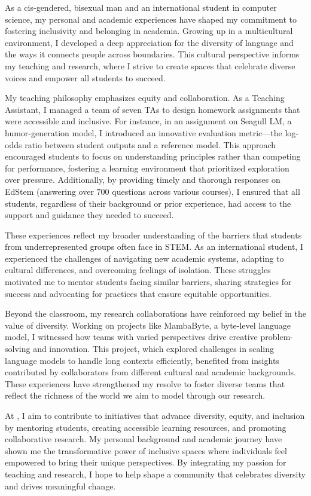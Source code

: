 As a cis-gendered, bisexual man and an international student in computer science, my personal and academic experiences have shaped my commitment to fostering inclusivity and belonging in academia.
% 
Growing up in a multicultural environment, I developed a deep appreciation for the diversity of language and the ways it connects people across boundaries.
% 
This cultural perspective informs my teaching and research, where I strive to create spaces that celebrate diverse voices and empower all students to succeed.

My teaching philosophy emphasizes equity and collaboration.
% 
As a Teaching Assistant, I managed a team of seven TAs to design homework assignments that were accessible and inclusive.
% 
For instance, in an assignment on Seagull LM, a humor-generation model, I introduced an innovative evaluation metric---the log-odds ratio between student outputs and a reference model.
% 
This approach encouraged students to focus on understanding principles rather than competing for performance, fostering a learning environment that prioritized exploration over pressure.
% 
Additionally, by providing timely and thorough responses on EdStem (answering over $700$ questions across various courses), I ensured that all students, regardless of their background or prior experience, had access to the support and guidance they needed to succeed.

These experiences reflect my broader understanding of the barriers that students from underrepresented groups often face in STEM.
% 
As an international student, I experienced the challenges of navigating new academic systems, adapting to cultural differences, and overcoming feelings of isolation.
% 
These struggles motivated me to mentor students facing similar barriers, sharing strategies for success and advocating for practices that ensure equitable opportunities.

Beyond the classroom, my research collaborations have reinforced my belief in the value of diversity.
% 
Working on projects like MambaByte, a byte-level language model, I witnessed how teams with varied perspectives drive creative problem-solving and innovation.
% 
This project, which explored challenges in scaling language models to handle long contexts efficiently, benefited from insights contributed by collaborators from different cultural and academic backgrounds.
% 
These experiences have strengthened my resolve to foster diverse teams that reflect the richness of the world we aim to model through our research.

At \thecollegeabbr, I aim to contribute to initiatives that advance diversity, equity, and inclusion by mentoring students, creating accessible learning resources, and promoting collaborative research.
% 
My personal background and academic journey have shown me the transformative power of inclusive spaces where individuals feel empowered to bring their unique perspectives.
% 
By integrating my passion for teaching and research, I hope to help shape a community that celebrates diversity and drives meaningful change.
